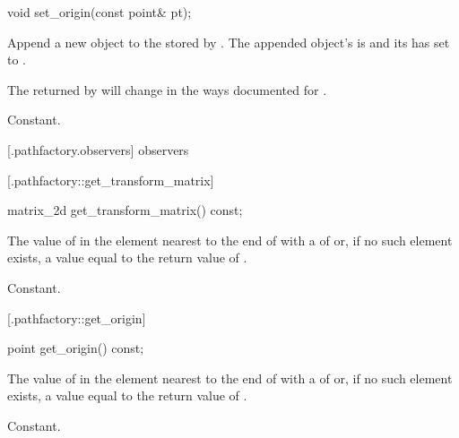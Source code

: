 %
%
\begin{itemdecl}
void set_origin(const point& pt);
\end{itemdecl}
\begin{itemdescr}
	\pnum
	\effects
	Append a new  object to the  stored by 
	. The appended object's  is 
	 and its  has 
	 set to .
	
	\pnum
	\postconditions
	The  returned by  will change 
	in the ways documented for .
	
	\pnum
	\complexity
	Constant.
\end{itemdescr}

 [\iotwod.pathfactory.observers] { observers}


 [\iotwod.pathfactory::get_transform_matrix] 
{}

%
%
\begin{itemdecl}
matrix_2d get_transform_matrix() const;
\end{itemdecl}
\begin{itemdescr}
	\pnum
	\returns
	The value of  in the element nearest to the 
	end of  with a  of 
	 or, if no such element exists, a 
	value equal to the return value of .
	
	\pnum
	\complexity
	Constant.
\end{itemdescr}

 [\iotwod.pathfactory::get_origin] {}

%
%
\begin{itemdecl}
point get_origin() const;
\end{itemdecl}
\begin{itemdescr}
	\pnum
	\returns
	The value of  in the element nearest to the 
	end of  with a  of 
	 or, if no such element exists, a 
	value equal to the return value of .
	
	\pnum
	\complexity
	Constant.
\end{itemdescr}

